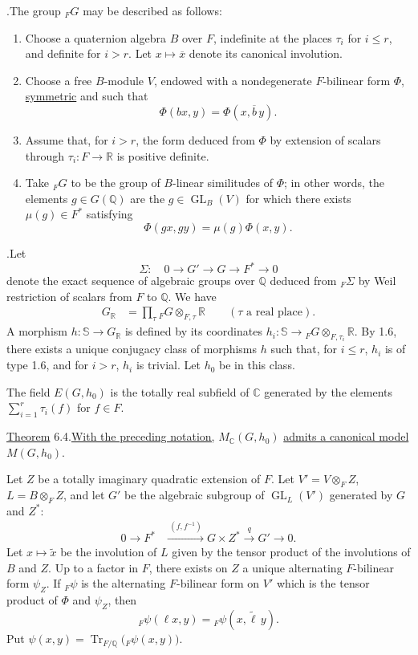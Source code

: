 \documentclass[10pt]{article}
\newcommand{\C}{\mathbb C}
\newcommand{\Q}{\mathbb Q}
\newcommand{\R}{\mathbb R}
\newcommand{\bS}{\mathbb S}
\newcommand{\GL}{\operatorname{GL}}
\newcommand{\MC}{M_{\C}}
\newcommand{\Tr}{\operatorname{Tr}}
\begin{document}
.\quad The group ${}_FG$ may be described as follows:
\begin{enumerate}[label=(\alph*)]
\item Choose a quaternion algebra $B$ over $F$, indefinite at the places $\tau_i$ for $i\le r$, and definite for $i>r$. Let $x\mapsto\overline{x}$ denote its canonical involution.
\item Choose a free $B$-module $V$, endowed with a nondegenerate $F$-bilinear form $\Phi$, \uline{symmetric} and such that
\[
\Phi(bx,y)=\Phi(x,\overline b\,y).
\]
\item Assume that, for $i>r$, the form deduced from $\Phi$ by extension of scalars through $\tau_i:F\to\R$ is positive definite.
\item Take ${}_FG$ to be the group of $B$-linear similitudes of $\Phi$; in other words, the elements $g\in G(\Q)$ are the $g\in\GL_B(V)$ for which there exists $\mu(g)\in F^*$ satisfying
\[
\Phi(gx,gy)=\mu(g)\Phi(x,y).
\]
\end{enumerate}
.\quad Let
\[
\Sigma:\quad 0\longrightarrow G'\longrightarrow G\longrightarrow F^*\longrightarrow0
\]
denote the exact sequence of algebraic groups over $\Q$ deduced from ${}_F\Sigma$ by Weil restriction of scalars from $F$ to $\Q$. We have
\begingroup
\makeatletter
\tagsleft@true
\makeatother
\begin{align}
G_{\R}&=\prod_{\tau}{}_FG\otimes_{F,\tau}\R
\qquad(\tau\text{ a real place}). \tag{6.3.1}
\end{align}
\endgroup
A morphism $h:\bS\to G_\R$ is defined by its coordinates $h_i:\bS\longrightarrow {}_FG\otimes_{F,\tau_i}\R$.
By 1.6, there exists a unique conjugacy class of morphisms $h$ such that, for $i\le r$, $h_i$ is of type 1.6, and for $i>r$, $h_i$ is trivial. Let $h_0$ be in this class.

The field $E(G,h_0)$ is the totally real subfield of $\C$ generated by the elements $\displaystyle\sum_{i=1}^r\tau_i(f)$ for $f\in F$.

\noindent \uline{Theorem} 6.4.\quad \uline{With the preceding notation,} $\MC(G,h_0)$ \uline{admits a canonical model} $M(G,h_0)$.

Let $Z$ be a totally imaginary quadratic extension of $F$. Let $V'=V\otimes_F Z$, $L=B\otimes_F Z$, and let $G'$ be the algebraic subgroup of $\GL_L(V')$ generated by $G$ and $Z^*$:
\begingroup
\makeatletter
\tagsleft@true
\makeatother
\begin{align}
0\longrightarrow F^*&\xrightarrow{\ (f,f^{-1})\ }G\times Z^*
 \xrightarrow{\ q\ }G'\longrightarrow0. \tag{6.4.1}
\end{align}
\endgroup
Let $x\mapsto\widetilde x$ be the involution of $L$ given by the tensor product of the involutions of $B$ and $Z$. Up to a factor in $F$, there exists on $Z$ a unique alternating $F$-bilinear form $\psi_Z$. If ${}_F\psi$ is the alternating $F$-bilinear form on $V'$ which is the tensor product of $\Phi$ and $\psi_Z$, then
\[
{}_F\psi(\ell x,y)={}_F\psi(x,\widetilde\ell\,y).
\]
Put $\psi(x,y)=\Tr_{F/\Q}\bigl({}_F\psi(x,y)\bigr)$.
\end{document}
